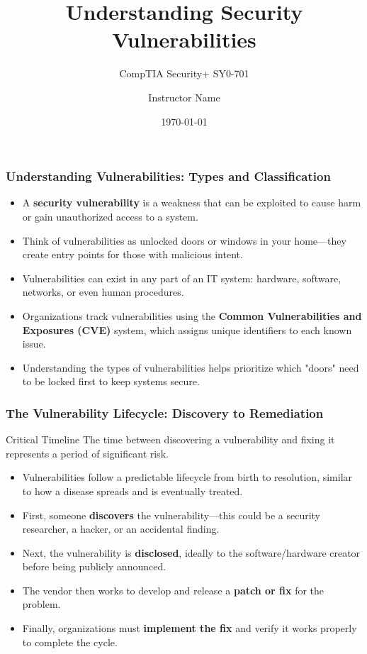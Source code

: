 \documentclass{beamer}
\title{Understanding Security Vulnerabilities}
\subtitle{CompTIA Security+ SY0-701}
\author{Instructor Name}
\institute{Institution Name}
\date{\today}
\begin{document}
\begin{frame}
    \titlepage
\end{frame}

\begin{frame}
    \frametitle{Understanding Vulnerabilities: Types and Classification}
    
    \begin{itemize}
        \item A \textbf{security vulnerability} is a weakness that can be exploited to cause harm or gain unauthorized access to a system.
        \item Think of vulnerabilities as unlocked doors or windows in your home—they create entry points for those with malicious intent.
        \item Vulnerabilities can exist in any part of an IT system: hardware, software, networks, or even human procedures.
        \item Organizations track vulnerabilities using the \textbf{Common Vulnerabilities and Exposures (CVE)} system, which assigns unique identifiers to each known issue.
        \item Understanding the types of vulnerabilities helps prioritize which "doors" need to be locked first to keep systems secure.
    \end{itemize}
\end{frame}

\begin{frame}
    \frametitle{The Vulnerability Lifecycle: Discovery to Remediation}
    
    \begin{alertblock}{Critical Timeline}
        The time between discovering a vulnerability and fixing it represents a period of significant risk.
    \end{alertblock}
    
    \begin{itemize}
        \item Vulnerabilities follow a predictable lifecycle from birth to resolution, similar to how a disease spreads and is eventually treated.
        \item First, someone \textbf{discovers} the vulnerability—this could be a security researcher, a hacker, or an accidental finding.
        \item Next, the vulnerability is \textbf{disclosed}, ideally to the software/hardware creator before being publicly announced.
        \item The vendor then works to develop and release a \textbf{patch or fix} for the problem.
        \item Finally, organizations must \textbf{implement the fix} and verify it works properly to complete the cycle.
    \end{itemize}
\end{frame}
\end{document}
